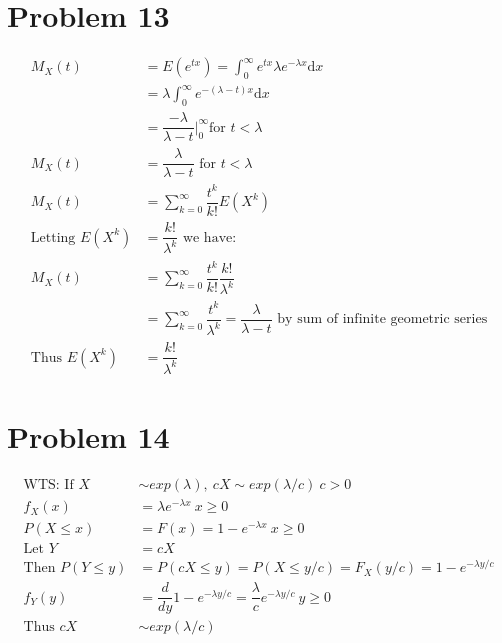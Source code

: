 \documentclass{article}
\newcommand{\dx}{\mathrm{d}x}
\begin{document}
\begin{flushleft}
\section*{Problem 13}
\begin{align*}
M_X(t)&=E(e^{tx})=\int_{0}^{\infty}e^{tx}\lambda e^{-\lambda x} \dx\\
&=\lambda\int_{0}^{\infty}e^{-(\lambda-t)x} \dx\\
&=\dfrac{-\lambda}{\lambda-t}\bigg|_{0}^{\infty} \text{for } t<\lambda\\
M_X(t)&=\dfrac{\lambda}{\lambda-t} \text{ for } t<\lambda\\
M_X(t)&=\sum_{k=0}^{\infty}\dfrac{t^k}{k!}E(X^k)\\
\text{Letting } E(X^k)&=\dfrac{k!}{\lambda^k} \text{ we have:}\\
M_X(t)&=\sum_{k=0}^{\infty}\dfrac{t^k}{k!}\dfrac{k!}{\lambda^k}\\
&=\sum_{k=0}^{\infty}\dfrac{t^k}{\lambda^k}=\dfrac{\lambda}{\lambda-t} \text{ by sum of infinite geometric series}\\
\text{Thus } E(X^k)&=\dfrac{k!}{\lambda^k}
\end{align*}
\section*{Problem 14}
\begin{align*}
\text{WTS: If } X &\sim exp(\lambda), \ cX\sim exp(\lambda/c) \ c>0\\
f_X(x)&=\lambda e^{-\lambda x} \ x\geq 0\\
P(X\leq x)&=F(x)=1-e^{-\lambda x} \ x\geq 0\\
\text{Let } Y&=cX\\
\text{Then } P(Y\leq y)&=P(cX\leq y)=P(X \leq y/c)=F_X(y/c)=1-e^{-\lambda y/c}\\
f_Y(y)&=\dfrac{d}{dy} 1-e^{-\lambda y/c}=\dfrac{\lambda}{c}e^{-\lambda y/c} \ y\geq 0\\
\text{Thus } cX &\sim exp(\lambda/c)
\end{align*}

\end{flushleft}
\end{document}
